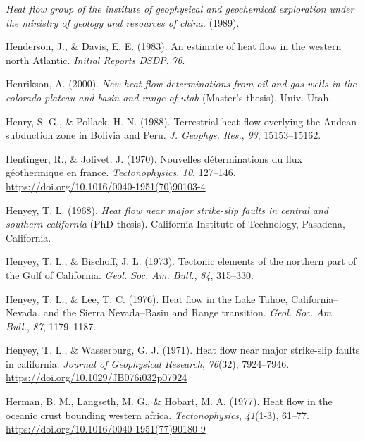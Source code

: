 \documentclass[draft,linenumbers]{agujournal2018}
\begin{document}
\leavevmode{}%
\emph{Heat flow group of the institute of geophysical and geochemical
exploration under the ministry of geology and resources of china}.
(1989).

\leavevmode{}%
Henderson, J., \& Davis, E. E. (1983). An estimate of heat flow in the
western north {Atlantic}. \emph{Initial Reports DSDP}, \emph{76}.

\leavevmode{}%
Henrikson, A. (2000). \emph{New heat flow determinations from oil and
gas wells in the colorado plateau and basin and range of utah} (Master's
thesis). Univ. Utah.

\leavevmode{}%
Henry, S. G., \& Pollack, H. N. (1988). Terrestrial heat flow overlying
the {Andean} subduction zone in {Bolivia and Peru}. \emph{J. Geophys.
Res.}, \emph{93}, 15153--15162.

\leavevmode{}%
Hentinger, R., \& Jolivet, J. (1970). Nouvelles déterminations du flux
géothermique en france. \emph{Tectonophysics}, \emph{10}, 127--146.
\url{https://doi.org/10.1016/0040-1951(70)90103-4}

\leavevmode{}%
Henyey, T. L. (1968). \emph{Heat flow near major strike-slip faults in
central and southern california} (PhD thesis). California Institute of
Technology, Pasadena, California.

\leavevmode{}%
Henyey, T. L., \& Bischoff, J. L. (1973). Tectonic elements of the
northern part of the {Gulf of California}. \emph{Geol. Soc. Am. Bull.},
\emph{84}, 315--330.

\leavevmode{}%
Henyey, T. L., \& Lee, T. C. (1976). Heat flow in the {Lake Tahoe,
California--Nevada}, and the {Sierra Nevada--Basin and Range}
transition. \emph{Geol. Soc. Am. Bull.}, \emph{87}, 1179--1187.

\leavevmode{}%
Henyey, T. L., \& Wasserburg, G. J. (1971). Heat flow near major
strike-slip faults in california. \emph{Journal of Geophysical
Research}, \emph{76}(32), 7924--7946.
\url{https://doi.org/10.1029/JB076i032p07924}

\leavevmode{}%
Herman, B. M., Langseth, M. G., \& Hobart, M. A. (1977). Heat flow in
the oceanic crust bounding western africa. \emph{Tectonophysics},
\emph{41}(1-3), 61--77.
\url{https://doi.org/10.1016/0040-1951(77)90180-9}
\end{document}

